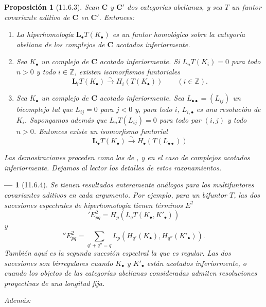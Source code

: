 \documentclass[10pt,oneside,openany]{book}
\theoremstyle{egaenv}\newtheorem*{env}{---}
\theoremstyle{egastatement}
\newtheorem*{proposition}{Proposición}
\theoremstyle{egadescription}
\newcommand{\oldpage}[2][]{\marginnote{\normalfont\scriptsize\textbf{#1}\,|\,#2}\ignorespaces}
\begin{document}
\begin{proposition}[11.6.3]
\label{0.11.6.3}
\label{0.11.6.3-fr}
Sean $\boldsymbol{C}$ y $\boldsymbol{C}'$ dos categorías abelianas, y sea $T$ un funtor covariante aditivo de $\boldsymbol{C}$ en $\boldsymbol{C}'$.
Entonces:
\begin{enumerate}
  \item[{\rm(i)}] {La hiperhomología $\mathbf{L}_\bullet T(K_\bullet)$ es un funtor homológico sobre la categoría abeliana de los complejos de $\boldsymbol{C}$ acotados inferiormente.}

  \item[{\rm(ii)}] {Sea $K_\bullet$ un complejo de $\boldsymbol{C}$ acotado inferiormente.
  Si $L_nT(K_i)=0$ para todo $n>0$ y todo $i\in\mathbb Z$, existen isomorfismos funtoriales}
  \[
\label{0.11.6.3.1-fr}
\tag{11.6.3.1}
\mathbf{L}_iT(K_\bullet)\xrightarrow{\sim} H_i(T(K_\bullet))\qquad(i\in\mathbb Z).
\]

  \item[{\rm(iii)}] {Sea $K_\bullet$ un complejo de $\boldsymbol{C}$ acotado inferiormente.
  Sea $L_{\bullet\bullet}=(L_{ij})$ un bicomplejo tal que $L_{ij}=0$ para $j<0$ y, para todo $i$, $L_{i,\bullet}$ es una resolución de $K_i$.
  Supongamos además que $L_nT(L_{ij})=0$ para todo par $(i,j)$ y todo $n>0$.
  Entonces existe un isomorfismo funtorial}
  \[
\label{0.11.6.3.2-fr}
\tag{11.6.3.2}
\mathbf{L}_\bullet T(K_\bullet)\xrightarrow{\sim} H_\bullet(T(L_{\bullet\bullet}))
\]
\end{enumerate}

\upshape Las demostraciones proceden como las de ,  y  en el caso de complejos acotados inferiormente.
Dejamos al lector los detalles de estos razonamientos.
\end{proposition}

\begin{env}[11.6.4]
\label{0.11.6.4}
\label{0.11.6.4-fr}
Se tienen resultados enteramente análogos para los \emph{multifuntores} covariantes aditivos en cada argumento.
Por ejemplo, para un bifuntor $T$, las dos sucesiones espectrales de hiperhomología tienen términos $E^2$
\oldpage[0\textsubscript{III}]{41}
\[
\label{0.11.6.4.1-fr}
\tag{11.6.4.1}
{}'E^2_{pq}=H_p(L_qT(K_\bullet,K'_\bullet))
\]
y
\[
\label{0.11.6.4.2-fr}
\tag{11.6.4.2}
{}''E^2_{pq}=
\sum_{q'+q''=q}L_p(H_{q'}(K_\bullet),H_{q''}(K'_\bullet)).
\]
También aquí es la \emph{segunda} sucesión espectral la que es regular.
Las dos sucesiones son birregulares cuando $K_\bullet$ y $K'_\bullet$ están acotados inferiormente, o cuando los objetos de las categorías abelianas consideradas admiten resoluciones proyectivas de una longitud fija.

Además:
\end{env}
\end{document}
